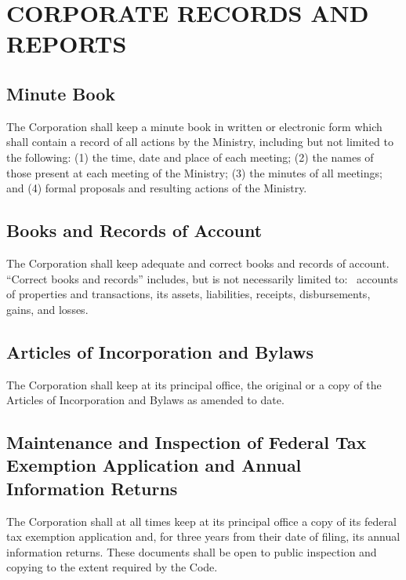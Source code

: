 \documentclass[letterpaper,titlepage]{article}
\begin{document}
\section{CORPORATE RECORDS AND REPORTS}
\label{sec:coporateRecords}
\subsection{Minute Book}
\label{sec:minuteBook}
The Corporation shall keep a minute book in written or electronic form which
shall contain a record of all actions by the Ministry, including but not
limited to the following: (1) the time, date and place of each meeting; (2) the names of those present at each meeting of the Ministry; (3) the minutes of all meetings; and (4) formal proposals and resulting actions of the Ministry. 
\subsection{Books and Records of Account}
\label{sec:booksRecords}
The Corporation shall keep adequate and correct books and records of account.
``Correct books and records'' includes, but is not necessarily limited to:  accounts of properties and transactions, its assets, liabilities, receipts, disbursements, gains, and losses.
\subsection{Articles of Incorporation and Bylaws}
\label{sec:articlesBylaws}
The Corporation shall keep at its principal office, the original or a copy of the Articles of Incorporation and Bylaws as amended to date.
\subsection{Maintenance and Inspection of Federal Tax Exemption Application and Annual Information Returns}
\label{sec:maintenanceInspection}
The Corporation shall at all times keep at its principal office a copy of its federal tax exemption application and, for three years from their date of filing, its annual information returns. These documents shall be open to public inspection and copying to the extent required by the Code.
\end{document}
